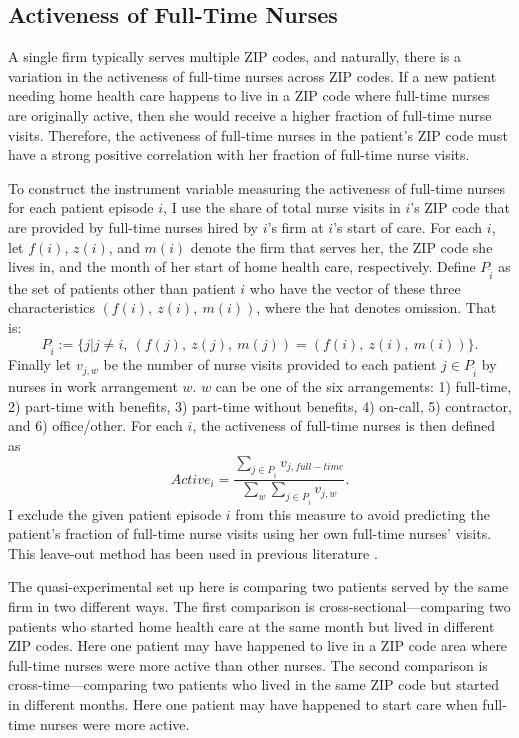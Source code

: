 \documentclass[final,12pt]{article}
\begin{document}
\subsection{Activeness of Full-Time Nurses}

A single firm typically serves multiple ZIP codes, and naturally, there is a variation in the activeness of full-time nurses across ZIP codes.
If a new patient needing home health care happens to live in a ZIP code where full-time nurses are originally active, then she would receive a higher fraction of full-time nurse visits.
Therefore, the activeness of full-time nurses in the patient's ZIP code must have a strong positive correlation with her fraction of full-time nurse visits.

To construct the instrument variable measuring the activeness of full-time nurses for each patient episode $i$, I use the share of total nurse visits in $i$'s ZIP code that are provided by full-time nurses hired by $i$'s firm at $i$'s start of care.
For each $i$, let $f(i)$, $z(i)$, and $m(i)$ denote the firm that  serves her, the ZIP code she lives in, and the month of her start of home health care, respectively.
Define $P_{\hat{i}}$ as the set of patients other than patient $i$ who have the vector of these three characteristics $(f(i), \ z(i), \ m(i))$, where the hat denotes omission. That is:
$$P_{\hat{i}} := \{ j | j \ne i , \ (f(j), \ z(j), \ m(j)) =  (f(i), \ z(i), \ m(i))\}.$$
Finally let $v_{j,w}$ be the number of nurse visits provided to each patient $j \in P_{\hat{i}}$ by nurses in work arrangement $w$.
$w$ can be one of the six arrangements: 1) full-time, 2) part-time with benefits, 3) part-time without benefits, 4) on-call, 5) contractor, and 6) office/other.
For each $i$, the activeness of full-time nurses is then defined as
\begin{equation}
Active_{i} = \frac{ \sum_{j \in P_{\hat{i}} } v_{j ,full-time} }{ \sum_w \sum_{j \in P_{\hat{i}} } v_{j,w} }.
\end{equation}
I exclude the given patient episode $i$ from this measure to avoid predicting the patient's fraction of full-time nurse visits using her own full-time nurses' visits. This leave-out method has been used in previous literature \citep{Angrist2009, DoyleJr2015}.


The quasi-experimental set up here is comparing two patients served by the same firm in two different ways.
The first comparison is cross-sectional---comparing two patients who started home health care at the same month but lived in different ZIP codes. Here one
patient may have happened to live in a ZIP code area where full-time nurses were more active than other nurses.
 The second comparison is cross-time---comparing two patients who lived in the same ZIP code but started in different months.
Here one patient may have happened to start care when full-time nurses were more active.
\end{document}
